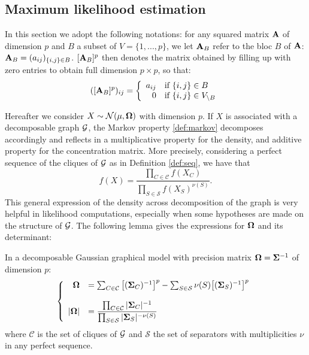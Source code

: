  \subsection{Maximum likelihood estimation}\label{ggm:mle}
In this section we adopt the following notations: for any  squared  matrix ${\bf A}$ of dimension $p$ and $B$ a subset of $V=\{1,...,p\}$, we let ${\bf A}_B$ refer to the bloc $B$ of ${\bf A}$: ${\bf A}_{B}=(a_{ij})_{\{i,j\}\in B}$.   $[{\bf A}_B]^p$ then denotes the matrix obtained by filling up with zero entries to obtain full dimension $p\times p$, so that:
$$([{\bf A}_B]^p )_{ij}=\left\{ \begin{array}{rl}
a_{ij} & \text{if } \{i,j\}\in B\\
0 &  \text{if } \{i,j\}\in V_{\setminus B}
\end{array}\right.$$

Hereafter we consider  $X\sim\mathcal{N} (\mu, {\boldsymbol{\Omega}})$ with dimension $p$. If $X$ is associated with a decomposable graph $\mathcal{G}$, the Markov property \ref{def:markov} decomposes accordingly and reflects in a multiplicative property for the density, and additive property for the concentration matrix. More precisely, considering a perfect sequence of the cliques of $\mathcal{G}$ as in Definition \ref{def:seq}, we have that
 $$f(X)=\dfrac{\prod_{C\in \mathcal{C}} f(X_C)}{\prod_{S\in \mathcal{S}} f(X_S)^{\nu(S)}}.$$
This general expression of the density across decomposition of the graph is very helpful in likelihood computations, especially when some hypotheses are made on the structure of $\mathcal{G}$. The following lemma gives the expressions for ${\boldsymbol{\Omega}}$ and its determinant:
 \begin{lemma} In a decomposable Gaussian graphical model with precision matrix ${\boldsymbol{\Omega}} = {\boldsymbol{\Sigma}}^{-1}$ of dimension $p$:
 \begin{equation*}
 \left\{
 \begin{array}{rl}
 {\boldsymbol{\Omega}} &= \sum_{C\in \mathcal{C}} \big[({\boldsymbol{\Sigma}}_C)^{-1}\big]^p - \sum_{S\in \mathcal{S}} \nu(S)  \big[({\boldsymbol{\Sigma}}_S)^{-1}\big]^p \\\\
 |{\boldsymbol{\Omega}}| &=\dfrac{\prod_{C\in \mathcal{C}} |{\boldsymbol{\Sigma}}_C|^{-1}}{\prod_{S\in \mathcal{S}} |{\boldsymbol{\Sigma}}_S|^{-\nu(S)}}
 \end{array} \right.
\end{equation*}  
where $\mathcal{C}$ is the set of cliques of $\mathcal{G}$ and $\mathcal{S}$ the set of separators with multiplicities $\nu$ in any perfect sequence. 
\end{lemma}

